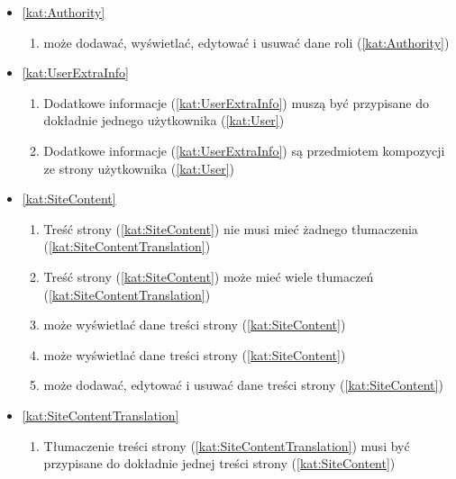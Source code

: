 \begin{itemize}[label={\textbf{Reguły dla}}, wide, labelwidth=!, labelindent=0pt]
\begin{enumerate}[label={\textbf{REG/\protect\threedigits{\arabic{enumi}}}}, wide, labelwidth=!, align=left, leftmargin=3cm, resume]
    \end{enumerate}
    \item\ref{kat:Authority}
    \begin{enumerate}[label={\textbf{REG/\protect\threedigits{\arabic{enumi}}}}, wide, labelwidth=!, align=left, leftmargin=3cm, resume]
        \item {} może dodawać, wyświetlać, edytować i usuwać dane roli (\ref{kat:Authority})
    \end{enumerate}
    \item\ref{kat:UserExtraInfo}
    \begin{enumerate}[label={\textbf{REG/\protect\threedigits{\arabic{enumi}}}}, wide, labelwidth=!, align=left, leftmargin=3cm, resume]
        \item Dodatkowe informacje (\ref{kat:UserExtraInfo}) muszą być przypisane do dokładnie jednego użytkownika (\ref{kat:User})
        \item Dodatkowe informacje (\ref{kat:UserExtraInfo}) są przedmiotem kompozycji ze strony użytkownika (\ref{kat:User})
    \end{enumerate}
    \item\ref{kat:SiteContent}
    \begin{enumerate}[label={\textbf{REG/\protect\threedigits{\arabic{enumi}}}}, wide, labelwidth=!, align=left, leftmargin=3cm, resume]
        \item Treść strony (\ref{kat:SiteContent}) nie musi mieć żadnego tłumaczenia (\ref{kat:SiteContentTranslation})
        \item Treść strony (\ref{kat:SiteContent}) może mieć wiele tłumaczeń (\ref{kat:SiteContentTranslation})
        \item {} może wyświetlać dane treści strony (\ref{kat:SiteContent})
        \item {} może wyświetlać dane treści strony (\ref{kat:SiteContent})
        \item {} może dodawać, edytować i usuwać dane treści strony (\ref{kat:SiteContent})
    \end{enumerate}
    \item\ref{kat:SiteContentTranslation}
    \begin{enumerate}[label={\textbf{REG/\protect\threedigits{\arabic{enumi}}}}, wide, labelwidth=!, align=left, leftmargin=3cm, resume]
        \item Tłumaczenie treści strony (\ref{kat:SiteContentTranslation}) musi być przypisane do dokładnie jednej treści strony (\ref{kat:SiteContent})

\end{enumerate}
\end{itemize}
